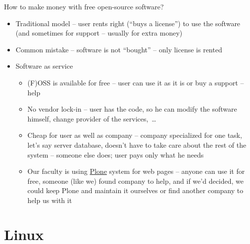 \documentclass[compress, ucs, xelatex, 11pt, xcolor=svgnames,
  hyperref={
    bookmarks=true,
    unicode=true,
    colorlinks=true,
    pdftitle={Linux, command line and MetaCentrum},
    plainpages=false,
    pdfauthor={Vojtech Zeisek},
    pdfsubject={Course about use of Linux command line, writing shell scripts and using MetaCentrum of CESNET},
    pdfcreator={XeLaTeX},
    pdfkeywords={Linux, GNU, BASH, shell, command line, MetaCentrum},
    linkcolor=Red,
    anchorcolor=Blue,
    citecolor=Purple,
    filecolor=DodgerBlue,
    menucolor=DarkOrchid,
    urlcolor=DeepSkyBlue,
    pdftex},
  url={hyphens, lowtilde} %
  ]{beamer}
\begin{document}
\begin{frame}{How to make money with free open-source software?}
\begin{itemize}
  \item Traditional model -- user rents right (``buys a license'') to use the software (and sometimes for support -- usually for extra money)
  \item Common mistake -- software is not ``bought'' -- only license is rented
  \item Software as service
  \begin{itemize}
    \item (F)OSS is available for free -- user can use it as it is or buy a support -- help
    \item No vendor lock-in -- user has the code, so he can modify the software himself, change provider of the services,~\ldots
    \item Cheap for user as well as company -- company specialized for one task, let's say server database, doesn't have to take care about the rest of the system -- someone else does; user pays only what he needs
    \item Our faculty is using \href{https://plone.org/}{Plone} system for web pages -- anyone can use it for free, someone (like we) found company to help, and if we'd decided, we  could keep Plone and maintain it ourselves or find another company to help us with it
  \end{itemize}
\end{itemize}
\end{frame}

\section{Linux}
\end{document}
